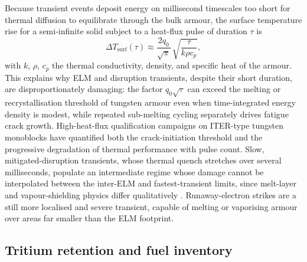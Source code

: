 Because transient events deposit energy on millisecond timescales too short for thermal diffusion to equilibrate through the bulk armour, the surface temperature rise for a semi-infinite solid subject to a heat-flux pulse of duration $\tau$ is
\begin{equation}
\Delta T_{\mathrm{surf}}(\tau) \approx \frac{2 q_{0}}{\sqrt{\pi}}\,\sqrt{\frac{\tau}{k \rho c_{p}}},
\label{eq:transient-temp}
\end{equation}
with $k$, $\rho$, $c_{p}$ the thermal conductivity, density, and specific heat of the armour. This explains why ELM and disruption transients, despite their short duration, are disproportionately damaging: the factor $q_{0}\sqrt{\tau}$ can exceed the melting or recrystallisation threshold of tungsten armour even when time-integrated energy density is modest, while repeated sub-melting cycling separately drives fatigue crack growth. High-heat-flux qualification campaigns on ITER-type tungsten monoblocks have quantified both the crack-initiation threshold and the progressive degradation of thermal performance with pulse count. Slow, mitigated-disruption transients, whose thermal quench stretches over several milliseconds, populate an intermediate regime whose damage cannot be interpolated between the inter-ELM and fastest-transient limits, since melt-layer and vapour-shielding physics differ qualitatively \cite{ref0176}. Runaway-electron strikes are a still more localised and severe transient, capable of melting or vaporising armour over areas far smaller than the ELM footprint.

\subsection{Tritium retention and fuel inventory}


